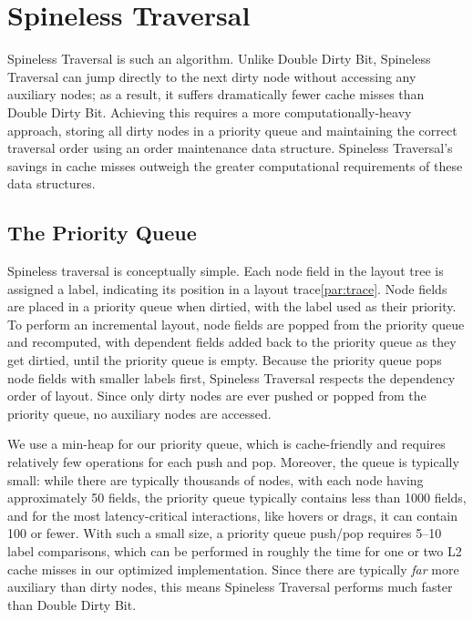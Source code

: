 \section{Spineless Traversal}

Spineless Traversal is such an algorithm.
Unlike Double Dirty Bit,
  Spineless Traversal can jump directly to the next dirty node
  without accessing any auxiliary nodes;
  as a result, it suffers dramatically fewer cache misses
  than Double Dirty Bit.
Achieving this requires a more computationally-heavy approach,
  storing all dirty nodes in a priority queue
  and maintaining the correct traversal order
  using an order maintenance data structure.
Spineless Traversal's savings in cache misses
  outweigh the greater computational requirements
  of these data structures.

\subsection{The Priority Queue}

Spineless traversal is conceptually simple.
Each node field in the layout tree is assigned a label,
  indicating its position in a layout trace\ref{par:trace}.
Node fields are placed in a priority queue when dirtied,
  with the label used as their priority.
To perform an incremental layout,
  node fields are popped from the priority queue and recomputed,
  with dependent fields
  added back to the priority queue as they get dirtied,
  until the priority queue is empty.
Because the priority queue pops node fields with smaller labels first,
  Spineless Traversal respects the dependency order of layout.
Since only dirty nodes are ever pushed or popped from the priority queue,
  no auxiliary nodes are accessed.

We use a min-heap for our priority queue,
  which is cache-friendly and requires relatively few operations
  for each push and pop.
Moreover, the queue is typically small:
  while there are typically thousands of nodes,
  with each node having approximately 50 fields,
  the priority queue typically contains less than 1000 fields,
  and for the most latency-critical interactions,
  like hovers or drags, it can contain 100 or fewer.
With such a small size, a priority queue push/pop requires
  5--10 label comparisons,
  which can be performed in roughly the time
  for one or two L2 cache misses
  in our optimized implementation.
Since there are typically \emph{far} more auxiliary than dirty nodes,
  this means Spineless Traversal performs much faster
  than Double Dirty Bit.

